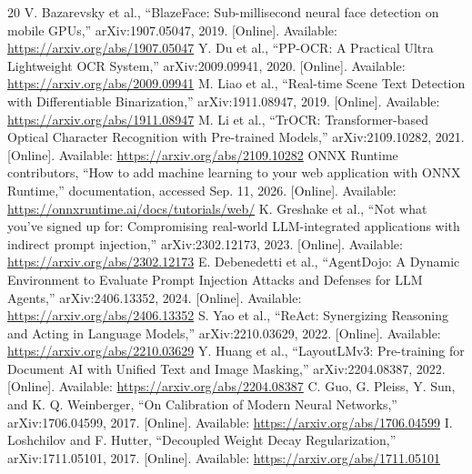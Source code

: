 \documentclass[conference]{IEEEtran}
\begin{document}
\begin{thebibliography}{20}
 V. Bazarevsky et al., ``BlazeFace: Sub-millisecond neural face detection on mobile GPUs,'' arXiv:1907.05047, 2019. [Online]. Available: \url{https://arxiv.org/abs/1907.05047}
 Y. Du et al., ``PP-OCR: A Practical Ultra Lightweight OCR System,'' arXiv:2009.09941, 2020. [Online]. Available: \url{https://arxiv.org/abs/2009.09941}
 M. Liao et al., ``Real-time Scene Text Detection with Differentiable Binarization,'' arXiv:1911.08947, 2019. [Online]. Available: \url{https://arxiv.org/abs/1911.08947}
 M. Li et al., ``TrOCR: Transformer-based Optical Character Recognition with Pre-trained Models,'' arXiv:2109.10282, 2021. [Online]. Available: \url{https://arxiv.org/abs/2109.10282}
 ONNX Runtime contributors, ``How to add machine learning to your web application with ONNX Runtime,'' documentation, accessed Sep. 11, 2026. [Online]. Available: \url{https://onnxruntime.ai/docs/tutorials/web/}
 K. Greshake et al., ``Not what you've signed up for: Compromising real-world LLM-integrated applications with indirect prompt injection,'' arXiv:2302.12173, 2023. [Online]. Available: \url{https://arxiv.org/abs/2302.12173}
 E. Debenedetti et al., ``AgentDojo: A Dynamic Environment to Evaluate Prompt Injection Attacks and Defenses for LLM Agents,'' arXiv:2406.13352, 2024. [Online]. Available: \url{https://arxiv.org/abs/2406.13352}
 S. Yao et al., ``ReAct: Synergizing Reasoning and Acting in Language Models,'' arXiv:2210.03629, 2022. [Online]. Available: \url{https://arxiv.org/abs/2210.03629}
 Y. Huang et al., ``LayoutLMv3: Pre-training for Document AI with Unified Text and Image Masking,'' arXiv:2204.08387, 2022. [Online]. Available: \url{https://arxiv.org/abs/2204.08387}
 C. Guo, G. Pleiss, Y. Sun, and K. Q. Weinberger, ``On Calibration of Modern Neural Networks,'' arXiv:1706.04599, 2017. [Online]. Available: \url{https://arxiv.org/abs/1706.04599}
 I. Loshchilov and F. Hutter, ``Decoupled Weight Decay Regularization,'' arXiv:1711.05101, 2017. [Online]. Available: \url{https://arxiv.org/abs/1711.05101}
\end{thebibliography}
\end{document}
